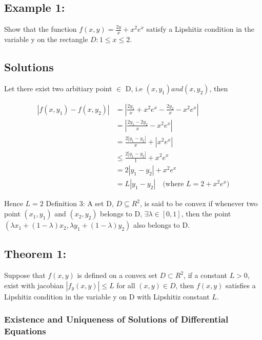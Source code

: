 \documentclass{article}
\begin{document}
\subsection*{Example 1:}Show that the function $f(x,y) = \frac{2y}{x} + x^{2}e^{x}$ satisfy a Lipshitiz condition in the variable y on the rectangle $D: 1 \leq x \leq 2$.

\subsection*{Solutions}
Let there exist two arbitiary point $\in$ D, i.e $(x,y_{1}) and (x,y_{2})$, then

\begin{equation} \label{eq1}
    \begin{split}
        |f(x, y_{1}) - f(x, y_{2})| & = \left|\frac{2y_{1}}{x} + x^{2}e^{x} - \frac{2y_{2}}{x} - x^{2}e^{x}\right| \\
        & = \left|\frac{2y_{1} - 2y_{2}}{x} - x^{2}e^{x}\right| \\
        & = \frac{2|y_{1} - y_{2}|}{x} + |x^{2}e^{x}| \\
        & \leq \frac{2|y_{1} - y_{2}|}{1} + x^{2}e^{x} \\
        & = 2|y_{1} - y_{2}| + x^{2}e^{x} \\
        & = L|y_{1} - y_{2}| \quad \text{(where } L = 2 + x^{2}e^{x})
    \end{split}
\end{equation}

Hence $L = 2$
\newline
Definition 3: A set D, $D\subseteq R^{2}$, is said to be convex if whenever two point $(x_{1}, y_{1})$ and $(x_{2}, y_{2})$ belongs to D, $\exists \lambda \in [0,1]$, then the point $(\lambda x_{1} + (1-\lambda)x_{2}, \lambda y_{1} + (1-\lambda)y_{2})$ also belongs to D.


\subsection*{Theorem 1:} Suppose that $f(x,y)$ is defined on a convex set $D \subset R^{2}$, if a constant $L > 0$, exist with jacobian $|f_{y}(x,y)| \leq L$ for all $(x,y) \in D$, then $f(x,y)$ satisfies a Lipshitiz condition in the variable y on D with Lipshitiz constant $L$.


\subsubsection{Existence and Uniqueness of Solutions of Differential Equations}
\end{document}

